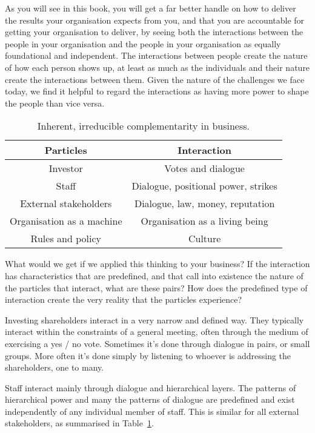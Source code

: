 As you will see in this book, you will get a far better handle on how to deliver the results your organisation expects from you, and that you are accountable for getting your organisation to deliver, by seeing both the interactions between the people in your organisation and the people in your organisation as equally foundational and independent. The interactions between people create the nature of how each person shows up, at least as much as the individuals and their nature create the interactions between them. Given the nature of the challenges we face today, we find it helpful to regard the interactions as having more power to shape the people than vice versa.


\begin{table}[htbp]
\centering
\begin{tabular}{ c  c  }
\toprule
\textbf{Particles} & \textbf{Interaction} \\
        \midrule
Investor & Votes and dialogue \\
Staff & Dialogue, positional power, strikes \\
External stakeholders & Dialogue, law, money, reputation \\ 
Organisation as a machine & Organisation as a living being \\
Rules and policy & Culture \\
\bottomrule
\end{tabular}
\caption[Complementarity in business]{Inherent, irreducible complementarity in business. }
\label{table:complementary-business-pairs}
\end{table}


What would we get if we applied this thinking to your business? If the interaction has characteristics that are predefined, and that call into existence the nature of the particles that interact, what are these pairs? How does the predefined type of interaction create the very reality that the particles experience?


Investing shareholders interact in a very narrow and defined way. They typically interact within the constraints of a general meeting, often through the medium of exercising a yes / no vote. Sometimes it’s done through dialogue in pairs, or small groups. More often it’s done simply by listening to whoever is addressing the shareholders, one to many.


Staff interact mainly through dialogue and hierarchical layers. The patterns of hierarchical power and many the patterns of dialogue are predefined and exist independently of any individual member of staff. This is similar for all external stakeholders, as summarised in Table~\ref{table:complementary-business-pairs}. 


